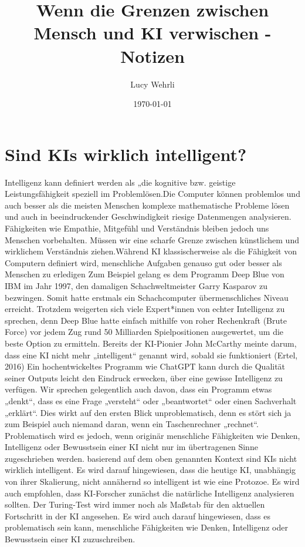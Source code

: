 \documentclass{article}
\title{Wenn die Grenzen zwischen Mensch und KI verwischen - Notizen}
\author{Lucy Wehrli}
\date{\today}
\begin{document}
\maketitle


\tableofcontents


\section{Sind KIs wirklich intelligent?}

   Intelligenz kann definiert werden als „die kognitive bzw. geistige Leistungsfähigkeit speziell im Problemlösen.Die Computer können problemlos und auch besser als die meisten Menschen komplexe mathematische Probleme lösen und auch in beeindruckender Geschwindigkeit riesige Datenmengen analysieren. Fähigkeiten wie Empathie, Mitgefühl und Verständnis bleiben jedoch uns Menschen vorbehalten. Müssen wir eine scharfe Grenze zwischen künstlichem und wirklichem Verständnis ziehen.Während KI klassischerweise als die Fähigkeit von Computern definiert wird, menschliche Aufgaben genauso gut oder besser als Menschen zu erledigen Zum Beispiel gelang es dem Programm Deep Blue von IBM im Jahr 1997, den damaligen Schachweltmeister Garry Kasparov zu bezwingen. Somit hatte erstmals ein Schachcomputer übermenschliches Niveau erreicht. Trotzdem weigerten sich viele Expert*innen von echter Intelligenz zu sprechen, denn Deep Blue hatte einfach mithilfe von roher Rechenkraft (Brute Force) vor jedem Zug rund 50 Milliarden Spielpositionen ausgewertet, um die beste Option zu ermitteln. Bereits der KI-Pionier John McCarthy meinte darum, dass eine KI nicht mehr „intelligent“ genannt wird, sobald sie funktioniert (Ertel, 2016) Ein hochentwickeltes Programm wie ChatGPT kann durch die Qualität seiner Outputs leicht den Eindruck erwecken, über eine gewisse Intelligenz zu verfügen. Wir sprechen gelegentlich auch davon, dass ein Programm etwas „denkt“, dass es eine Frage „versteht“ oder „beantwortet“ oder einen Sachverhalt „erklärt“. Dies wirkt auf den ersten Blick unproblematisch, denn es stört sich ja zum Beispiel auch niemand daran, wenn ein Taschenrechner „rechnet“. Problematisch wird es jedoch, wenn originär menschliche Fähigkeiten wie Denken, Intelligenz oder Bewusstsein einer KI nicht nur im übertragenen Sinne zugeschrieben werden.  basierend auf dem oben genannten Kontext sind KIs nicht wirklich intelligent. Es wird darauf hingewiesen, dass die heutige KI, unabhängig von ihrer Skalierung, nicht annähernd so intelligent ist wie eine Protozoe. Es wird auch empfohlen, dass KI-Forscher zunächst die natürliche Intelligenz analysieren sollten. Der Turing-Test wird immer noch als Maßstab für den aktuellen Fortschritt in der KI angesehen. Es wird auch darauf hingewiesen, dass es problematisch sein kann, menschliche Fähigkeiten wie Denken, Intelligenz oder Bewusstsein einer KI zuzuschreiben. 
\end{document}
